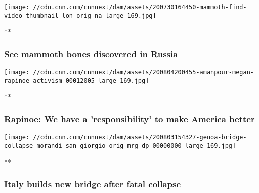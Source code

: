 \href{/videos/world/2020/07/30/mammoth-remains-found-russia-scn-lon-orig-na.cnn/video/playlists/trending-video/}{}

\texttt{[image: //cdn.cnn.com/cnnnext/dam/assets/200730164450-mammoth-find-video-thumbnail-lon-orig-na-large-169.jpg]}

**

\hypertarget{see-mammoth-bones-discovered-in-russia}{%
\subsubsection{\texorpdfstring{\href{/videos/world/2020/07/30/mammoth-remains-found-russia-scn-lon-orig-na.cnn/video/playlists/trending-video/}{See
mammoth bones discovered in
Russia}}{See mammoth bones discovered in Russia}}\label{see-mammoth-bones-discovered-in-russia}}

\href{/videos/world/2020/08/04/amanpour-megan-rapinoe-activism.cnn/video/playlists/trending-video/}{}

\texttt{[image: //cdn.cnn.com/cnnnext/dam/assets/200804200455-amanpour-megan-rapinoe-activism-00012005-large-169.jpg]}

**

\hypertarget{rapinoe-we-have-a-responsibility-to-make-america-better}{%
\subsubsection{\texorpdfstring{\href{/videos/world/2020/08/04/amanpour-megan-rapinoe-activism.cnn/video/playlists/trending-video/}{Rapinoe:
We have a 'responsibility' to make America
better}}{Rapinoe: We have a 'responsibility' to make America better}}\label{rapinoe-we-have-a-responsibility-to-make-america-better}}

\href{/videos/world/2020/08/03/genoa-bridge-collapse-morandi-san-giorgio-orig-mrg-dp.cnn/video/playlists/trending-video/}{}

\texttt{[image: //cdn.cnn.com/cnnnext/dam/assets/200803154327-genoa-bridge-collapse-morandi-san-giorgio-orig-mrg-dp-00000000-large-169.jpg]}

**

\hypertarget{italy-builds-new-bridge-after-fatal-collapse}{%
\subsubsection{\texorpdfstring{\href{/videos/world/2020/08/03/genoa-bridge-collapse-morandi-san-giorgio-orig-mrg-dp.cnn/video/playlists/trending-video/}{Italy
builds new bridge after fatal
collapse}}{Italy builds new bridge after fatal collapse}}\label{italy-builds-new-bridge-after-fatal-collapse}}

